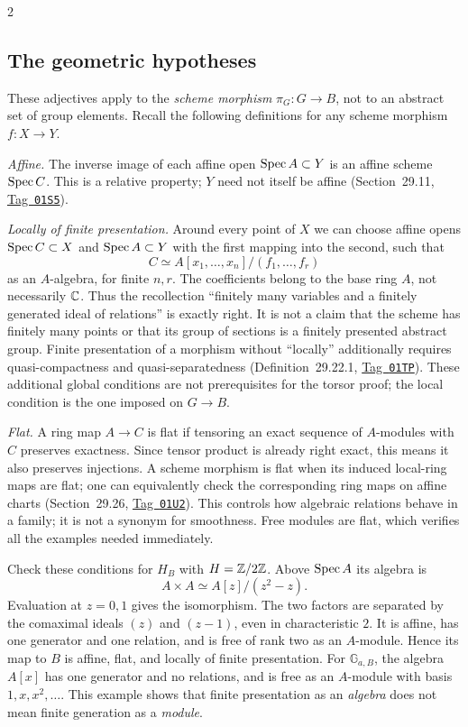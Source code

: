 \documentclass[12pt]{memoir}
\newcommand{\BGtag}[1]{\href{https://stacks.math.columbia.edu/tag/#1}{Tag~\texttt{#1}}}
\begin{document}
\begin{multicols}{2}
\subsection{The geometric hypotheses}
These adjectives apply to the \emph{scheme morphism} $\pi_G:G\to B$,
not to an abstract set of group elements. Recall the following
definitions for any scheme morphism $f:X\to Y$.

\emph{Affine.} The inverse image of each affine open $\operatorname{Spec} A\subset Y$
is an affine scheme $\operatorname{Spec} C$. This is a relative property; $Y$ need
not itself be affine (Section~29.11, \BGtag{01S5}).

\emph{Locally of finite presentation.} Around every point of $X$ we
can choose affine opens $\operatorname{Spec} C\subset X$ and $\operatorname{Spec} A\subset Y$
with the first mapping into the second, such that
\[
 C\simeq A[x_1,\ldots,x_n]/(f_1,\ldots,f_r)
\]
as an $A$-algebra, for finite $n,r$. The coefficients belong to the
base ring $A$, not necessarily $\mathbb{C}$. Thus the recollection ``finitely
many variables and a finitely generated ideal of relations'' is exactly
right. It is not a claim that the scheme has finitely many points or
that its group of sections is a finitely presented abstract group.
Finite presentation of a morphism without ``locally'' additionally
requires quasi-compactness and quasi-separatedness
(Definition~29.22.1, \BGtag{01TP}). These additional global conditions
are not prerequisites for the torsor proof; the local condition is the
one imposed on $G\to B$.

\emph{Flat.} A ring map $A\to C$ is flat if tensoring an exact sequence
of $A$-modules with $C$ preserves exactness. Since tensor product is
already right exact, this means it also preserves injections. A scheme
morphism is flat when its induced local-ring maps are flat; one can
equivalently check the corresponding ring maps on affine charts
(Section~29.26, \BGtag{01U2}). This controls how algebraic relations
behave in a family; it is not a synonym for smoothness. Free modules
are flat, which verifies all the examples needed immediately.

Check these conditions for $H_B$ with $H=\mathbb{Z}/2\mathbb{Z}$. Above $\operatorname{Spec} A$
its algebra is
\[
 A\times A\simeq A[z]/(z^2-z).
\]
Evaluation at $z=0,1$ gives the isomorphism. The two factors are
separated by the comaximal ideals $(z)$ and $(z-1)$, even in
characteristic $2$. It is affine, has one generator and one relation,
and is free of rank two as an $A$-module. Hence its map to $B$ is
affine, flat, and locally of finite presentation.
For $\mathbb G_{a,B}$, the algebra $A[x]$ has one generator and no
relations, and is free as an $A$-module with basis $1,x,x^2,\ldots$.
This example shows that finite presentation as an \emph{algebra} does
not mean finite generation as a \emph{module}.


\end{multicols}
\end{document}

